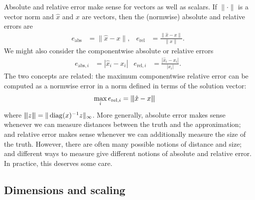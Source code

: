 \documentclass[12pt, leqno]{article} %
\begin{document}
Absolute and relative error make sense for vectors as well as scalars.
If $\| \cdot \|$ is a vector
norm and $\hat{x}$ and $x$ are vectors, then the (normwise) absolute
and relative errors are
\begin{align*}
  e_{\mathrm{abs}} &= \|\hat{x}-x\|, &
  e_{\mathrm{rel}} &= \frac{\|\hat{x}-x\|}{\|x\|}.
\end{align*}
We might also consider the componentwise absolute or relative errors
\begin{align*}
  e_{\mathrm{abs},i} &= |\hat{x}_i-x_i| &
  e_{\mathrm{rel},i} &= \frac{|\hat{x}_i-x_i|}{|x_i|}.
\end{align*}
The two concepts are related: the maximum componentwise relative error
can be computed as a normwise error in a norm defined in terms of the
solution vector:
\begin{align*}
  \max_i e_{\mathrm{rel},i} &= {\left\vert\kern-0.25ex\left\vert\kern-0.25ex\left\vert \hat{x}-x \right\vert\kern-0.25ex\right\vert\kern-0.25ex\right\vert}
\end{align*}
where ${\left\vert\kern-0.25ex\left\vert\kern-0.25ex\left\vert z \right\vert\kern-0.25ex\right\vert\kern-0.25ex\right\vert} = \|\operatorname{diag}(x)^{-1} z\|_\infty$.
More generally, absolute error makes sense whenever we can measure
distances between the truth and the approximation; and relative error
makes sense whenever we can additionally measure the size of the
truth.  However, there are often many possible notions of distance
and size; and different ways to measure give different notions of
absolute and relative error.  In practice, this deserves some care.

\subsection{Dimensions and scaling}
\end{document}
